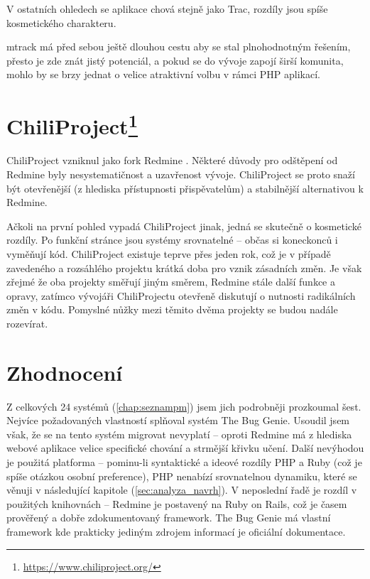 \documentclass[thesis=B,czech]{FITthesis}[2012/05/02]
\begin{document}
V ostatních ohledech se aplikace chová stejně jako Trac, rozdíly jsou
spíše kosmetického charakteru.

mtrack má před sebou ještě dlouhou cestu aby se stal plnohodnotným
řešením, přesto je zde znát jistý potenciál, a pokud se do vývoje zapojí
širší komunita, mohlo by se brzy jednat o velice atraktivní volbu v
rámci PHP aplikací.

\section[ChiliProject]{ChiliProject\footnote{\url{https://www.chiliproject.org/}}}

ChiliProject vzniknul jako \gls{fork} Redmine
\citep{ChiliProjectWhyFork}. Některé důvody pro odštěpení od Redmine
byly nesystematičnost a uzavřenost vývoje. ChiliProject se proto snaží
být otevřenější (z hlediska přístupnosti přispěvatelům) a stabilnější
alternativou k Redmine.

Ačkoli na první pohled vypadá ChiliProject jinak, jedná se skutečně o
kosmetické rozdíly. Po funkční stránce jsou systémy srovnatelné -- občas
si koneckonců i vyměňují kód. ChiliProject existuje teprve přes jeden
rok, což je v případě zavedeného a rozsáhlého projektu krátká doba pro
vznik zásadních změn. Je však zřejmé že oba projekty směřují jiným
směrem, Redmine stále  další funkce a opravy, zatímco
vývojáři ChiliProjectu otevřeně diskutují o nutnosti radikálních změn v
kódu. Pomyslné nůžky mezi těmito dvěma projekty se budou nadále
rozevírat.

\section{Zhodnocení}

Z celkových 24 systémů (\ref{chap:seznampm}) jsem jich podrobněji
prozkoumal šest. Nejvíce požadovaných vlastností splňoval systém The Bug
Genie. Usoudil jsem však, že se na tento systém migrovat nevyplatí --
oproti Redmine má z hlediska webové aplikace velice specifické chování a
strmější křivku učení. Další nevýhodou je použitá platforma -- pominu-li
syntaktické a ideové rozdíly PHP a Ruby (což je spíše otázkou osobní
preference), PHP nenabízí srovnatelnou dynamiku, které se věnuji v
následující kapitole (\ref{sec:analyza_navrh}). V neposlední řadě je
rozdíl v použitých knihovnách -- Redmine je postavený na Ruby on Rails,
což je časem prověřený a dobře zdokumentovaný framework. The Bug Genie
má vlastní framework kde prakticky jediným zdrojem informací je
oficiální dokumentace.
\end{document}
